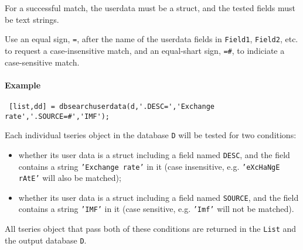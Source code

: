  For a successful match, the userdata must be a struct, and the tested
 fields must be text strings.
 
 Use an equal sign, \texttt{=}, after the name of the userdata fields in
 \texttt{Field1}, \texttt{Field2}, etc. to request a case-insensitive
 match, and an equal-shart sign, \texttt{=\#}, to indiciate a
 case-sensitive match.
 
 \paragraph{Example}
 
 \begin{verbatim}
 [list,dd] = dbsearchuserdata(d,'.DESC=','Exchange rate','.SOURCE=#','IMF');
 \end{verbatim}
 
 Each individual tseries object in the database \texttt{D} will be tested
 for two conditions:
 
 \begin{itemize}
 \item
   whether its user data is a struct including a field named
   \texttt{DESC}, and the field contains a string
   \texttt{'Exchange rate'} in it (case insensitive, e.g.
   \texttt{'eXcHaNgE rAtE'} will also be matched);
 \item
   whether its user data is a struct including a field named
   \texttt{SOURCE}, and the field contains a string \texttt{'IMF'} in it
   (case sensitive, e.g. \texttt{'Imf'} will not be matched).
 \end{itemize}
 
 All tseries object that pass both of these conditions are returned in
 the \texttt{List} and the output database \texttt{D}.


